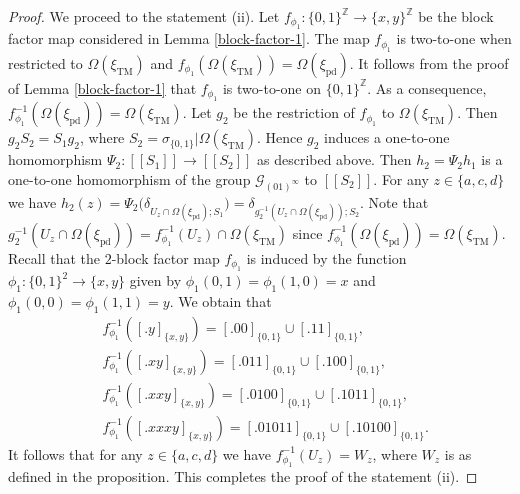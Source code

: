 \documentclass[10pt,a4paper]{amsart}
\def\Om{\Omega}
\def\bZ{\mathbb{Z}}
\def\cG{\mathcal{G}}
\def\de{\delta}
\def\si{\sigma}
\def\xiTM{\xi_{\mathrm{TM}}}
\def\xipd{\xi_{\mathrm{pd}}}
\begin{document}
\begin{proof}
We proceed to the statement (ii).  Let 
$f_{\phi_1}:\{0,1\}^{\bZ}\to\{x,y\}^{\bZ}$ be the block factor map 
considered in Lemma \ref{block-factor-1}.  The map $f_{\phi_1}$ is 
two-to-one when restricted to $\Om(\xiTM)$ and $f_{\phi_1}(\Om(\xiTM))= 
\Om(\xipd)$.  It follows from the proof of Lemma \ref{block-factor-1} that 
$f_{\phi_1}$ is two-to-one on $\{0,1\}^{\bZ}$.  As a consequence, 
$f_{\phi_1}^{-1}(\Om(\xipd))=\Om(\xiTM)$.  Let $g_2$ be the restriction of 
$f_{\phi_1}$ to $\Om(\xiTM)$.  Then $g_2S_2=S_1g_2$, where 
$S_2=\si_{\{0,1\}}|\Om(\xiTM)$.  Hence $g_2$ induces a one-to-one 
homomorphism $\Psi_2:[[S_1]]\to[[S_2]]$ as described above.  Then 
$h_2=\Psi_2h_1$ is a one-to-one homomorphism of the group 
$\cG_{(01)^\infty}$ to $[[S_2]]$.  For any $z\in\{a,c,d\}$ we have
$h_2(z)=\Psi_2\bigl(\de_{U_z\cap\Om(\xipd);S_1}\bigr)
=\de_{g_2^{-1}(U_z\cap\Om(\xipd));S_2}$.  Note that 
$g_2^{-1}(U_z\cap\Om(\xipd))=f_{\phi_1}^{-1}(U_z)\cap\Om(\xiTM)$ since 
$f_{\phi_1}^{-1}(\Om(\xipd))=\Om(\xiTM)$.  Recall that the $2$-block factor
map $f_{\phi_1}$ is induced by the function $\phi_1:\{0,1\}^2\to\{x,y\}$
given by $\phi_1(0,1)=\phi_1(1,0)=x$ and 
$\phi_1(0,0)=\phi_1(1,1)=y$.  We obtain that
\begin{align*}
&f_{\phi_1}^{-1}([.y]_{\{x,y\}}) = [.00]_{\{0,1\}}\cup [.11]_{\{0,1\}},\\
&f_{\phi_1}^{-1}([.xy]_{\{x,y\}}) = [.011]_{\{0,1\}}\cup 
[.100]_{\{0,1\}},\\
&f_{\phi_1}^{-1}([.xxy]_{\{x,y\}}) = [.0100]_{\{0,1\}}\cup
[.1011]_{\{0,1\}},\\
&f_{\phi_1}^{-1}([.xxxy]_{\{x,y\}}) = [.01011]_{\{0,1\}}\cup 
[.10100]_{\{0,1\}}.
\end{align*}
It follows that for any $z\in\{a,c,d\}$ we have $f_{\phi_1}^{-1}(U_z)=W_z$, 
where $W_z$ is as defined in the proposition.  This completes the proof of 
the statement (ii).
\end{proof}
\end{document}
